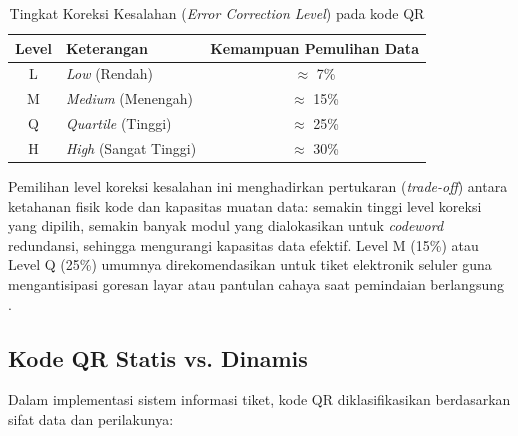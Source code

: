 \begin{table}[htbp]
    \centering
    \caption{Tingkat Koreksi Kesalahan (\textit{Error Correction Level}) pada kode QR \cite{tiwari2016introduction}}
    \label{tab:error_correction}
    \begin{tabularx}{\textwidth}{| c | >{\raggedright\arraybackslash}X | c |}
        \hline
        \textbf{Level} & \textbf{Keterangan} & \textbf{Kemampuan Pemulihan Data} \\
        \hline
        L & \textit{Low} (Rendah) & $\approx$ 7\% \\
        \hline
        M & \textit{Medium} (Menengah) & $\approx$ 15\% \\
        \hline
        Q & \textit{Quartile} (Tinggi) & $\approx$ 25\% \\
        \hline
        H & \textit{High} (Sangat Tinggi) & $\approx$ 30\% \\
        \hline
    \end{tabularx}
\end{table}

Pemilihan level koreksi kesalahan ini menghadirkan pertukaran (\textit{trade-off}) antara ketahanan fisik kode dan kapasitas muatan data: semakin tinggi level koreksi yang dipilih, semakin banyak modul yang dialokasikan untuk \textit{codeword} redundansi, sehingga mengurangi kapasitas data efektif. Level M (15\%) atau Level Q (25\%) umumnya direkomendasikan untuk tiket elektronik seluler guna mengantisipasi goresan layar atau pantulan cahaya saat pemindaian berlangsung \cite{tiwari2016introduction}.

\subsection{Kode QR Statis vs. Dinamis}
Dalam implementasi sistem informasi tiket, kode QR diklasifikasikan berdasarkan sifat data dan perilakunya:

